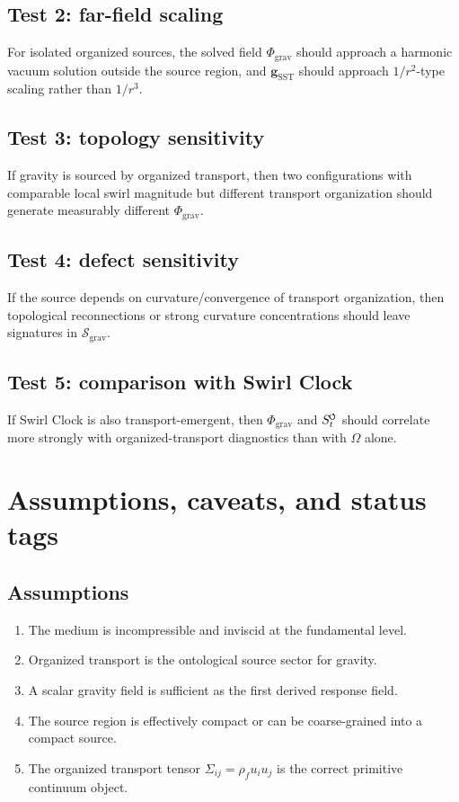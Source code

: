 \documentclass[11pt]{article}
\newcommand{\swirlarrow}{\mathchoice{\mkern-2mu\scriptstyle\boldsymbol{\circlearrowleft}}{\mkern-2mu\scriptstyle\boldsymbol{\circlearrowleft}}{\mkern-2mu\scriptscriptstyle\boldsymbol{\circlearrowleft}}{\mkern-2mu\scriptscriptstyle\boldsymbol{\circlearrowleft}}}
\newcommand{\rhoF}{\rho_{\!f}}
\newcommand{\SwirlClock}{S_t^{\swirlarrow}}
\newcommand{\SST}{\mathrm{SST}}
\newcommand{\grav}{\mathrm{grav}}
\begin{document}
        \subsection{Test 2: far-field scaling}
            For isolated organized sources, the solved field \(\Phi_{\grav}\) should approach a harmonic vacuum solution outside the source region, and \(\mathbf{g}_{\SST}\) should approach \(1/r^2\)-type scaling rather than \(1/r^3\).
        
        \subsection{Test 3: topology sensitivity}
            If gravity is sourced by organized transport, then two configurations with comparable local swirl magnitude but different transport organization should generate measurably different \(\Phi_{\grav}\).
        
        \subsection{Test 4: defect sensitivity}
            If the source depends on curvature/convergence of transport organization, then topological reconnections or strong curvature concentrations should leave signatures in \(\mathcal{S}_{\grav}\).
        
        \subsection{Test 5: comparison with Swirl Clock}
            If Swirl Clock is also transport-emergent, then \(\Phi_{\grav}\) and \(\SwirlClock\) should correlate more strongly with organized-transport diagnostics than with \(\Omega\) alone.
        
        \section{Assumptions, caveats, and status tags}
        
        \subsection{Assumptions}
            \begin{enumerate}[label=(A\arabic*)]
\item The medium is incompressible and inviscid at the fundamental level.
\item Organized transport is the ontological source sector for gravity.
\item A scalar gravity field is sufficient as the first derived response field.
\item The source region is effectively compact or can be coarse-grained into a compact source.
\item The organized transport tensor \(\Sigma_{ij}=\rhoF u_i u_j\) is the correct primitive continuum object.
            \end{enumerate}
        
\end{document}
